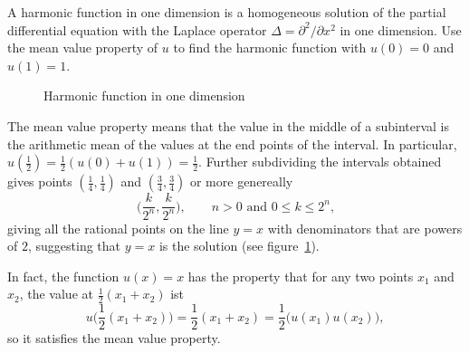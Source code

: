 A harmonic function in one dimension is a homogeneous solution of the
partial differential equation with the Laplace operator
$\Delta = \partial^2/\partial x^2$ in one dimension.
Use the mean value property of $u$ to find the harmonic function
with $u(0)=0$ and $u(1)=1$.

\begin{loesung}
\begin{figure}
\centering
{}
\caption{Harmonic function in one dimension
\label{70000013:fig}}
\end{figure}
The mean value property means that the value in the middle of a
subinterval is the arithmetic mean of the values at the end points
of the interval.
In particular, $u(\frac12)=\frac12(u(0)+u(1)) = \frac12$.
Further subdividing the intervals obtained gives points
$(\frac14,\frac14)$ and
$(\frac34,\frac34)$ or more genereally
\[
\biggl(\frac{k}{2^n},\frac{k}{2^n}\biggr),
\qquad
\text{$n>0$ and $0\le k\le 2^n$,}
\]
giving all the rational points on the line $y=x$ with denominators that
are powers of $2$, suggesting that $y=x$ is the solution
(see figure~\ref{70000013:fig}).

In fact, the function $u(x)=x$ has the property that for any two
points $x_1$ and $x_2$, the value at $\frac12(x_1+x_2)$ ist
\[
u\bigl({\textstyle\frac12}(x_1+x_2)\bigr)
=
{\textstyle\frac12}(x_1+x_2)
=
\frac12\bigl(u(x_1) u(x_2)\bigr),
\]
so it satisfies the mean value property.
\end{loesung}

